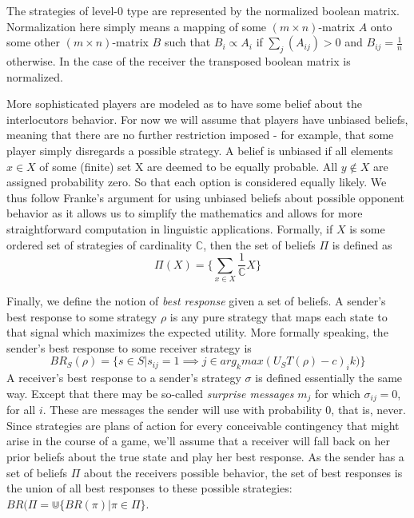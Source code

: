 \documentclass[10]{article}
\begin{document}
The strategies of level-0 type are represented by the normalized boolean matrix. Normalization here simply means a mapping of some $(m\times n)$-matrix $A$ onto some other $(m\times n)$-matrix $B$ such that $B_i\propto A_i$ if $\sum_j (A_{ij})>0$ and $B_{ij}=\tfrac{1}{n}$ otherwise. In the case of the receiver the transposed boolean matrix is normalized.

More sophisticated players are modeled as to have some belief about the interlocutors behavior. For now we will assume that players have unbiased beliefs, meaning that there are no further restriction imposed - for example, that some player simply disregards a possible strategy. A belief is unbiased if all elements $x\in X$ of some (finite) set X are deemed to be equally probable. All $y\not\in X$ are assigned probability zero. So that each option is considered equally likely. We thus follow Franke's argument for
 using unbiased beliefs about possible opponent behavior as it allows us to simplify the mathematics and allows for more straightforward computation in linguistic applications. Formally, if $X$ is some ordered set of strategies of cardinality $\mathbb{C}$, then the set of beliefs $\Pi$ is defined as\\
\begin{equation*}
\Pi(X)=\{\sum_{x\in X} \dfrac{1}{\mathbb{C}}X\}
\end{equation*} %


Finally, we define the notion of \textit{best response} given a set of beliefs. A sender's best response to some strategy $\rho$ is any pure strategy that maps each state to that signal which maximizes the expected utility.
More formally speaking, the sender's best response to some receiver strategy is\\
\begin{equation*}
BR_S(\rho)=\{s\in S | s_{ij}=1\implies j \in arg_kmax(U_S T(\rho)-c)_ik)\}
\end{equation*} 
A receiver's best response to a sender's strategy $\sigma$ is defined essentially the same way. Except that there may be so-called \textit{surprise messages} $m_j$ for which $\sigma_{ij}=0$, for all $i$. These are messages the sender will use with probability 0, that is, never. Since strategies are plans of action for every conceivable contingency that might arise in the course of a game, we'll assume that a receiver will fall back on her prior beliefs about the true state and play her best response.
As the sender has a set of beliefs $\Pi$ about the receivers possible behavior, the set of best responses is the union of all best responses to these possible strategies: $BR(\Pi=\Cup\{BR(\pi)|\pi\in\Pi\}$.
\end{document}
